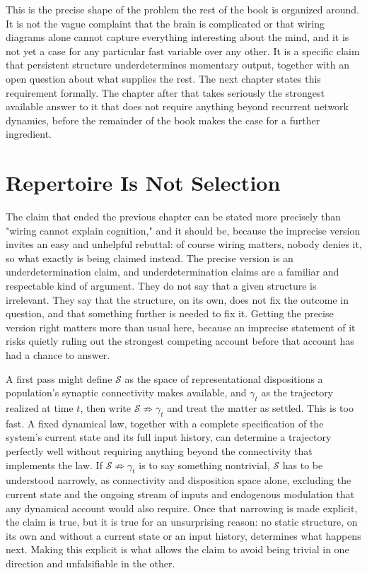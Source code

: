 \documentclass[11pt]{book}
\begin{document}
This is the precise shape of the problem the rest of the book is organized around. It is not the vague complaint that the brain is complicated or that wiring diagrams alone cannot capture everything interesting about the mind, and it is not yet a case for any particular fast variable over any other. It is a specific claim that persistent structure underdetermines momentary output, together with an open question about what supplies the rest. The next chapter states this requirement formally. The chapter after that takes seriously the strongest available answer to it that does not require anything beyond recurrent network dynamics, before the remainder of the book makes the case for a further ingredient.

\chapter{Repertoire Is Not Selection}

The claim that ended the previous chapter can be stated more precisely than "wiring cannot explain cognition," and it should be, because the imprecise version invites an easy and unhelpful rebuttal: of course wiring matters, nobody denies it, so what exactly is being claimed instead. The precise version is an underdetermination claim, and underdetermination claims are a familiar and respectable kind of argument. They do not say that a given structure is irrelevant. They say that the structure, on its own, does not fix the outcome in question, and that something further is needed to fix it. Getting the precise version right matters more than usual here, because an imprecise statement of it risks quietly ruling out the strongest competing account before that account has had a chance to answer.

A first pass might define $\mathcal S$ as the space of representational dispositions a population's synaptic connectivity makes available, and $\gamma_t$ as the trajectory realized at time $t$, then write $\mathcal S \not\Rightarrow \gamma_t$ and treat the matter as settled. This is too fast. A fixed dynamical law, together with a complete specification of the system's current state and its full input history, can determine a trajectory perfectly well without requiring anything beyond the connectivity that implements the law. If $\mathcal S \not\Rightarrow \gamma_t$ is to say something nontrivial, $\mathcal S$ has to be understood narrowly, as connectivity and disposition space alone, excluding the current state and the ongoing stream of inputs and endogenous modulation that any dynamical account would also require. Once that narrowing is made explicit, the claim is true, but it is true for an unsurprising reason: no static structure, on its own and without a current state or an input history, determines what happens next. Making this explicit is what allows the claim to avoid being trivial in one direction and unfalsifiable in the other.
\end{document}
